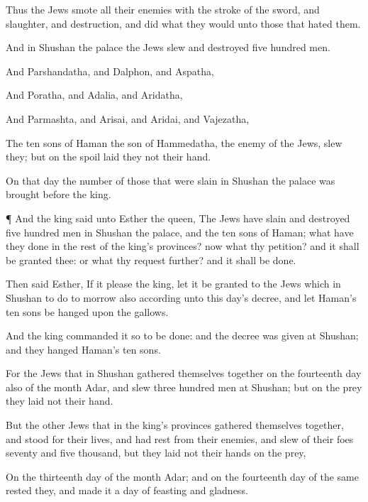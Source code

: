 {Thus the
Jews
smote all their
enemies with the
stroke of the
sword, and
slaughter, and
destruction, and
did what they
would unto those that
hated them.

And in
Shushan the
palace the
Jews
slew and
destroyed
five
hundred
men.

And
Parshandatha, and
Dalphon, and
Aspatha,

And
Poratha, and
Adalia, and
Aridatha,

And
Parmashta, and
Arisai, and
Aridai, and
Vajezatha,

The
ten
sons of
Haman the
son of
Hammedatha, the
enemy of the
Jews,
slew they; but on the
spoil
laid they not their
hand.

On that
day the
number of those that were
slain in
Shushan the
palace was
brought
before the
king.


\par }{\PP {}¶ And the
king
said unto
Esther the
queen, The
Jews have
slain and
destroyed
five
hundred
men in
Shushan the
palace, and the
ten
sons of
Haman; what have they
done in the
rest of the
king’s
provinces? now what
{} thy
petition? and it shall be
granted thee: or what
{} thy
request
further? and it shall be
done.

Then
said
Esther, If it
please the
king, let it be
granted to the
Jews which
{} in
Shushan to
do to
morrow also according unto this
day’s
decree, and let
Haman’s
ten
sons be
hanged upon the
gallows.

And the
king
commanded it so to be
done: and the
decree was
given at
Shushan; and they
hanged
Haman’s
ten
sons.

For the
Jews that
{} in
Shushan gathered themselves
together on the
fourteenth
day also of the
month
Adar, and
slew
three
hundred
men at
Shushan; but on the
prey they
laid not their
hand.

But the
other
Jews that
{} in the
king’s
provinces gathered themselves
together, and
stood for their
lives, and had
rest from their
enemies, and
slew of their
foes
seventy and
five
thousand, but they
laid not their
hands on the
prey,

On the
thirteenth
day of the
month
Adar; and on the
fourteenth day of the same
rested they, and
made it a
day of
feasting and
gladness.

}
